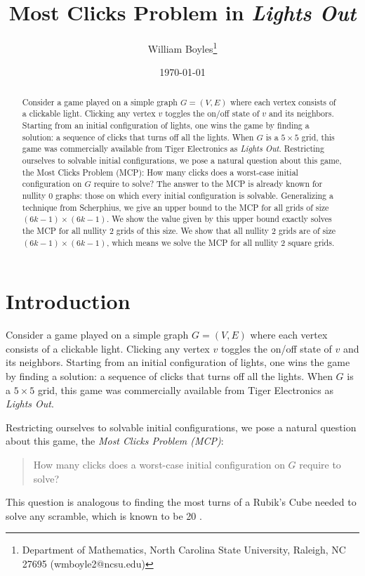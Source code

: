 \documentclass[a4paper]{article}
\begin{document}
	\title{Most Clicks Problem in \textit{Lights Out}}
	\author{William Boyles\thanks{Department of Mathematics, North Carolina State University, Raleigh, NC 27695 (wmboyle2@ncsu.edu)}}
	\date{\today}
	\maketitle
	
	\begin{abstract}
		Consider a game played on a simple graph $G = (V, E)$ where each vertex consists of a clickable light. Clicking any vertex $v$ toggles the on/off state of $v$ and its neighbors. Starting from an initial configuration of lights, one wins the game by finding a solution: a sequence of clicks that turns off all the lights. When $G$ is a $5 \times 5$ grid, this game was commercially available from Tiger Electronics as \textit{Lights Out}. Restricting ourselves to solvable initial configurations, we pose a natural question about this game, the Most Clicks Problem (MCP): How many clicks does a worst-case initial configuration
		on $G$ require to solve? The answer to the MCP is already known for nullity 0 graphs: those on which every initial configuration is solvable. Generalizing a technique from Scherphius, we give an upper bound to the MCP for all grids of size $(6k - 1) \times (6k - 1)$. We show the value given by this upper bound exactly solves the MCP for all nullity 2 grids of this size. We show that all nullity 2 grids are of size $(6k - 1) \times (6k - 1)$, which means we solve the MCP for all nullity 2 square grids.
	\end{abstract}
	
	\section{Introduction}
	Consider a game played on a simple graph $G=(V,E)$ where each vertex consists of a clickable light.
	Clicking any vertex $v$ toggles the on/off state of $v$ and its neighbors.
	Starting from an initial configuration of lights, one wins the game by finding a solution: a sequence of clicks that turns off all the lights.
	When $G$ is a $5 \times 5$ grid, this game was commercially available from Tiger Electronics as \textit{Lights Out}.
	
	Restricting ourselves to solvable initial configurations, we pose a natural question about this game, the \textit{Most Clicks Problem (MCP)}:
	\begin{quote}
		How many clicks does a worst-case initial configuration on $G$ require to solve?
	\end{quote}
	This question is analogous to finding the most turns of a Rubik's Cube needed to solve any scramble, which is known to be 20 \cite{Rockiki2013}.
	
\end{document}
